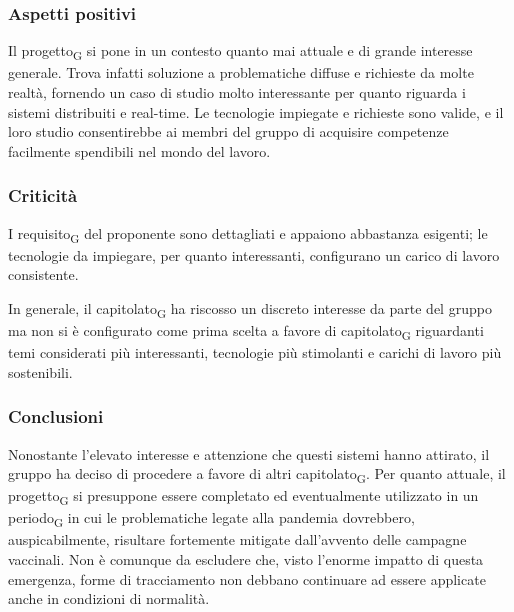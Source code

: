 	
	
\subsubsection{Aspetti positivi}

Il progetto\textsubscript{G} si pone in un contesto quanto mai attuale e di grande interesse generale. Trova infatti soluzione a problematiche diffuse e richieste da molte realtà, fornendo un caso di studio molto interessante per quanto riguarda i sistemi distribuiti e real-time. Le tecnologie impiegate e richieste sono valide, e il loro studio consentirebbe ai membri del gruppo di acquisire competenze facilmente spendibili nel mondo del lavoro.



\subsubsection{Criticità}

I requisito\textsubscript{G} del proponente sono dettagliati e appaiono abbastanza esigenti; le tecnologie da impiegare, per quanto interessanti, configurano un carico di lavoro consistente.

In generale, il capitolato\textsubscript{G} ha riscosso un discreto interesse da parte del gruppo ma non si è configurato come prima scelta a favore di capitolato\textsubscript{G} riguardanti temi considerati più interessanti, tecnologie più stimolanti e carichi di lavoro più sostenibili. 



\subsubsection{Conclusioni}

Nonostante l'elevato interesse e attenzione che questi sistemi hanno attirato, il gruppo ha deciso di procedere a favore di altri capitolato\textsubscript{G}.
Per quanto attuale, il progetto\textsubscript{G} si presuppone essere completato ed eventualmente utilizzato in un periodo\textsubscript{G} in cui le problematiche legate alla pandemia dovrebbero, auspicabilmente, risultare fortemente mitigate dall'avvento delle campagne vaccinali. Non è comunque da escludere che, visto l'enorme impatto di questa emergenza, forme di tracciamento non debbano continuare ad essere applicate anche in condizioni di normalità.




